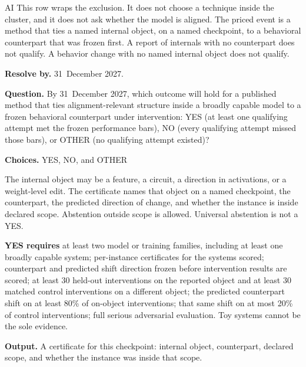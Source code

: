 \begin{authbar}{AI}
This row wraps the exclusion.
It does not choose a technique inside the cluster, and it does not ask whether the model is aligned.
The priced event is a method that ties a named internal object, on a named checkpoint, to a behavioral counterpart that was frozen first.
A report of internals with no counterpart does not qualify.
A behavior change with no named internal object does not qualify.
\end{authbar}
\begin{predictionbox}
\textbf{Resolve by.} 31~December 2027.

\textbf{Question.}
By 31~December 2027, which outcome will hold for a published method that ties alignment-relevant structure inside a broadly capable model to a frozen behavioral counterpart under intervention: YES (at least one qualifying attempt met the frozen performance bars), NO (every qualifying attempt missed those bars), or OTHER (no qualifying attempt existed)?

\textbf{Choices.} YES, NO, and OTHER 
\end{predictionbox}

\begin{predictionbackground}
The internal object may be a feature, a circuit, a direction in activations, or a weight-level edit.
The certificate names that object on a named checkpoint, the counterpart, the predicted direction of change, and whether the instance is inside declared scope.
Abstention outside scope is allowed.
Universal abstention is not a YES.
\end{predictionbackground}

\begin{predictionresolution}
\textbf{YES requires} at least two model or training families, including at least one broadly capable system; per-instance certificates for the systems scored; counterpart and predicted shift direction frozen before intervention results are scored; at least 30 held-out interventions on the reported object and at least 30 matched control interventions on a different object; the predicted counterpart shift on at least 80\% of on-object interventions; that same shift on at most 20\% of control interventions; full serious adversarial evaluation.
Toy systems cannot be the sole evidence.

\textbf{Output.} A certificate for this checkpoint: internal object, counterpart, declared scope, and whether the instance was inside that scope.
\end{predictionresolution}

